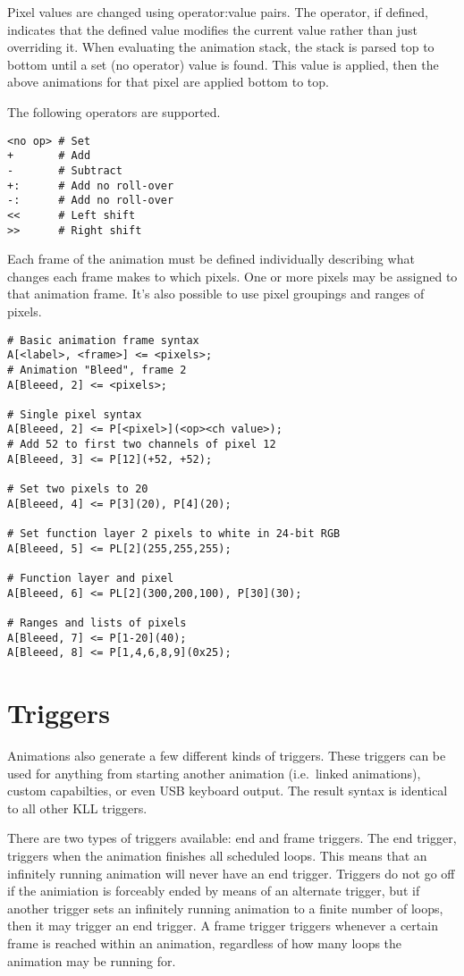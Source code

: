 \documentclass{kiibohd-template}
\begin{document}
Pixel values are changed using operator:value pairs.
The operator, if defined, indicates that the defined value modifies the current value rather than just overriding it.
When evaluating the animation stack, the stack is parsed top to bottom until a set (no operator) value is found.
This value is applied, then the above animations for that pixel are applied bottom to top.

The following operators are supported.

\begin{lstlisting}
<no op> # Set
+       # Add
-       # Subtract
+:      # Add no roll-over
-:      # Add no roll-over
<<      # Left shift
>>      # Right shift
\end{lstlisting}

Each frame of the animation must be defined individually describing what changes each frame makes to which pixels.
One or more pixels may be assigned to that animation frame.
It's also possible to use pixel groupings and ranges of pixels.

\begin{lstlisting}
# Basic animation frame syntax
A[<label>, <frame>] <= <pixels>;
# Animation "Bleed", frame 2
A[Bleeed, 2] <= <pixels>;

# Single pixel syntax
A[Bleeed, 2] <= P[<pixel>](<op><ch value>);
# Add 52 to first two channels of pixel 12
A[Bleeed, 3] <= P[12](+52, +52);

# Set two pixels to 20
A[Bleeed, 4] <= P[3](20), P[4](20);

# Set function layer 2 pixels to white in 24-bit RGB
A[Bleeed, 5] <= PL[2](255,255,255);

# Function layer and pixel
A[Bleeed, 6] <= PL[2](300,200,100), P[30](30);

# Ranges and lists of pixels
A[Bleeed, 7] <= P[1-20](40);
A[Bleeed, 8] <= P[1,4,6,8,9](0x25);
\end{lstlisting}


\section{Triggers}

Animations also generate a few different kinds of triggers.
These triggers can be used for anything from starting another animation (i.e.\ linked animations), custom capabilties, or even USB keyboard output.
The result syntax is identical to all other KLL triggers.

There are two types of triggers available: end and frame triggers.
The end trigger, triggers when the animation finishes all scheduled loops.
This means that an infinitely running animation will never have an end trigger.
Triggers do not go off if the animiation is forceably ended by means of an alternate trigger, but if another trigger sets an infinitely running animation to a finite number of loops, then it may trigger an end trigger.
A frame trigger triggers whenever a certain frame is reached within an animation, regardless of how many loops the animation may be running for.
\end{document}
